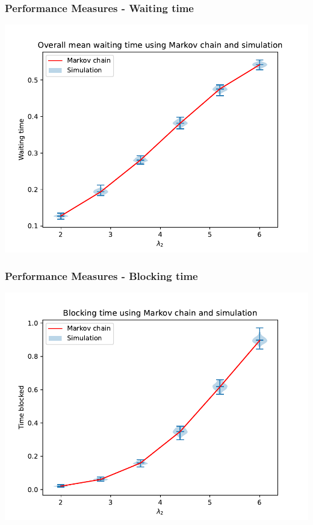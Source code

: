 \begin{frame}
    \frametitle{Performance Measures - Waiting time}
    \centering

    \includegraphics[scale=0.65]{Bin/waiting_overall_comparison.pdf}
\end{frame}


\begin{frame}
    \frametitle{Performance Measures - Blocking time}
    \centering

    \includegraphics[scale=0.65]{Bin/blocking_comparison.pdf}
\end{frame}